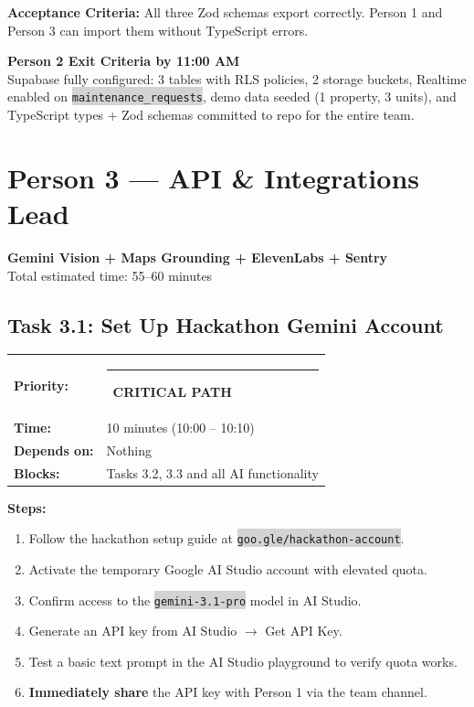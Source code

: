 \documentclass[11pt, a4paper]{article}
\newcommand{\critical}{\textcolor{critred}{\rule{6pt}{6pt}}~\textcolor{critred}{\scriptsize\textbf{CRITICAL PATH}}}
\newcommand{\code}[1]{\texttt{\small\colorbox{lightgray}{#1}}}
\begin{document}
\textbf{Acceptance Criteria:} All three Zod schemas export correctly. Person 1 and Person 3 can import them without TypeScript errors.

\vspace{0.5em}

\begin{milestonebox}
\textbf{Person 2 Exit Criteria by 11:00 AM}\\[4pt]
Supabase fully configured: 3 tables with RLS policies, 2 storage buckets, Realtime enabled on \code{maintenance\_requests}, demo data seeded (1 property, 3 units), and TypeScript types + Zod schemas committed to repo for the entire team.
\end{milestonebox}

\newpage

\section{Person 3 --- API \& Integrations Lead}
\begin{center}
\textcolor{medpurple}{\large\textbf{Gemini Vision + Maps Grounding + ElevenLabs + Sentry}}\\[2pt]
\textcolor{textmuted}{\small Total estimated time: 55--60 minutes}
\end{center}

\vspace{0.5em}

\subsection{Task 3.1: Set Up Hackathon Gemini Account}

\begin{tabularx}{\textwidth}{lX}
\textbf{Priority:} & \critical \\
\textbf{Time:} & 10 minutes (10:00 -- 10:10) \\
\textbf{Depends on:} & Nothing \\
\textbf{Blocks:} & Tasks 3.2, 3.3 and all AI functionality \\
\end{tabularx}

\vspace{0.3em}

\textbf{Steps:}
\begin{enumerate}[leftmargin=2em, itemsep=2pt]
  \item Follow the hackathon setup guide at \code{goo.gle/hackathon-account}.
  \item Activate the temporary Google AI Studio account with elevated quota.
  \item Confirm access to the \code{gemini-3.1-pro} model in AI Studio.
  \item Generate an API key from AI Studio $\rightarrow$ Get API Key.
  \item Test a basic text prompt in the AI Studio playground to verify quota works.
  \item \textbf{Immediately share} the API key with Person 1 via the team channel.
\end{enumerate}
\end{document}

